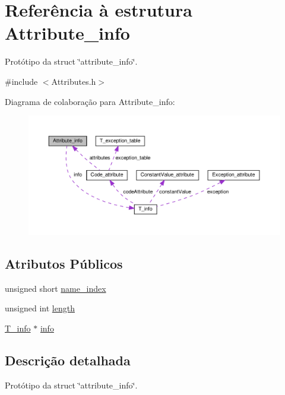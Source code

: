 \hypertarget{structAttribute__info}{}\section{Referência à estrutura Attribute\+\_\+info}
\label{structAttribute__info}


Protótipo da struct \char`\"{}attribute\+\_\+info\char`\"{}.  




{\ttfamily \#include $<$Attributes.\+h$>$}



Diagrama de colaboração para Attribute\+\_\+info\+:\nopagebreak
\begin{figure}[H]
\begin{center}
\leavevmode
\includegraphics[width=350pt]{structAttribute__info__coll__graph}
\end{center}
\end{figure}
\subsection*{Atributos Públicos}
\begin{DoxyCompactItemize}
\item 
unsigned short \hyperlink{structAttribute__info_aa20aae72733ad98febeea64ad7927526}{name\+\_\+index}
\item 
unsigned int \hyperlink{structAttribute__info_aa76577f95471a7093757bb127f24702f}{length}
\item 
\hyperlink{unionT__info}{T\+\_\+info} $\ast$ \hyperlink{structAttribute__info_a8612e1228cbf9673986c9fee603dceca}{info}
\end{DoxyCompactItemize}


\subsection{Descrição detalhada}
Protótipo da struct \char`\"{}attribute\+\_\+info\char`\"{}. 

